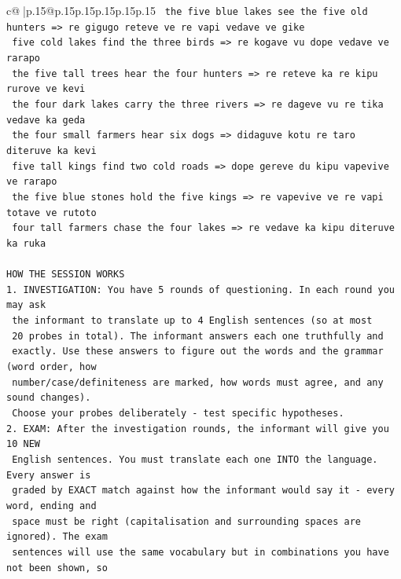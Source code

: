 \documentclass{article}
\begin{document}
{\begin{supertabular}{c@{$\;$}|p{.15\linewidth}@{}p{.15\linewidth}p{.15\linewidth}p{.15\linewidth}p{.15\linewidth}p{.15\linewidth}}
{{{\texttt{    the five blue lakes see the five old hunters  =>  re gigugo reteve ve re vapi vedave ve gike} \\
\texttt{    five cold lakes find the three birds  =>  re kogave vu dope vedave ve rarapo} \\
\texttt{    the five tall trees hear the four hunters  =>  re reteve ka re kipu rurove ve kevi} \\
\texttt{    the four dark lakes carry the three rivers  =>  re dageve vu re tika vedave ka geda} \\
\texttt{    the four small farmers hear six dogs  =>  didaguve kotu re taro diteruve ka kevi} \\
\texttt{    five tall kings find two cold roads  =>  dope gereve du kipu vapevive ve rarapo} \\
\texttt{    the five blue stones hold the five kings  =>  re vapevive ve re vapi totave ve rutoto} \\
\texttt{    four tall farmers chase the four lakes  =>  re vedave ka kipu diteruve ka ruka} \\
\\ 
\texttt{HOW THE SESSION WORKS} \\
\texttt{1. INVESTIGATION: You have 5 rounds of questioning. In each round you may ask} \\
\texttt{   the informant to translate up to 4 English sentences (so at most} \\
\texttt{   20 probes in total). The informant answers each one truthfully and} \\
\texttt{   exactly. Use these answers to figure out the words and the grammar (word order, how} \\
\texttt{   number/case/definiteness are marked, how words must agree, and any sound changes).} \\
\texttt{   Choose your probes deliberately {-} test specific hypotheses.} \\
\texttt{2. EXAM: After the investigation rounds, the informant will give you 10 NEW} \\
\texttt{   English sentences. You must translate each one INTO the language. Every answer is} \\
\texttt{   graded by EXACT match against how the informant would say it {-} every word, ending and} \\
\texttt{   space must be right (capitalisation and surrounding spaces are ignored). The exam} \\
\texttt{   sentences will use the same vocabulary but in combinations you have not been shown, so} \\
}}}
\end{supertabular}}
\end{document}
